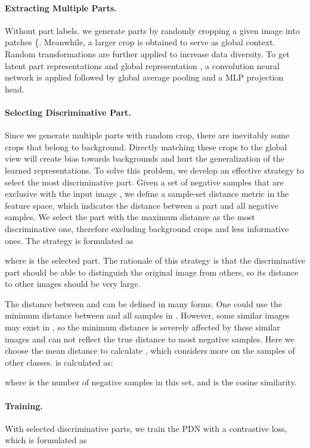 \documentclass{article}
\begin{document}
\paragraph{Extracting Multiple Parts.} Without part labels, we generate parts by randomly cropping a given image  into  patches \{. Meanwhile, a larger crop  is obtained to serve as global context. Random transformations are further applied to increase data diversity. To get latent part representations  and global representation , a convolution neural network  is applied followed by global average pooling and a MLP projection head.

\paragraph{Selecting Discriminative Part.} Since we generate multiple parts with random crop, there are inevitably some crops that belong to background. Directly matching these crops to the global view will create bias towards backgrounds and hurt the generalization of the learned representations. To solve this problem, we develop an effective strategy to select the most discriminative part. Given a set of negative samples  that are exclusive with the input image , we define a sample-set distance metric  in the feature space, which indicates the distance between a part and all negative samples. We select the part with the maximum distance as the most discriminative one, therefore excluding background crops and less informative ones. The strategy is formulated as

where  is the selected part. The rationale of this strategy is that the discriminative part should be able to distinguish the original image from others, so its distance to other images should be very large.

The distance between  and  can be defined in many forms. One could use the minimum distance between  and all samples in . However, some similar images may exist in , so the minimum distance is severely affected by these similar images and can not reflect the true distance to most negative samples. 
Here we choose the mean distance to calculate ,  which considers more on the samples of other classes.
 is calculated as:

where  is the number of negative samples in this set, and  is the cosine similarity.





\paragraph{Training.} 
With selected discriminative parts, we train the PDN with a contrastive loss, which is formulated as
\end{document}
